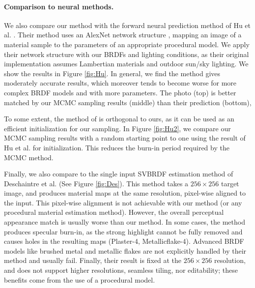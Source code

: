 



\paragraph*{Comparison to neural methods.}
We also compare our method with the forward neural prediction method of Hu et al. \cite{Hu2019}. Their method uses an AlexNet network structure \cite{krizhevsky2012imagenet}, mapping an image of a material sample to the parameters of an appropriate procedural model. We apply their network structure with our BRDFs and lighting conditions, as their original implementation assumes Lambertian materials and outdoor sun/sky lighting. We show the results in Figure \ref{fig:Hu}. In general, we find the method gives moderately accurate results, which moreover tends to become worse for more complex BRDF models and with more parameters. The photo (top) is better matched by our MCMC sampling results (middle) than their prediction (bottom),

To some extent, the method of \cite{Hu2019} is orthogonal to ours, as it can be used as an efficient initialization for our sampling. In Figure \ref{fig:Hu2}, we compare our MCMC sampling results with a random starting point to one using the result of Hu et al. for initialization. This reduces the burn-in period required by the MCMC method.

Finally, we also compare to the single input SVBRDF estimation method of Deschaintre et al. \cite{Deschaintre2018} (See Figure \ref{fig:Des}). This method takes a $256 \times 256$ target image, and produces material maps at the same resolution, pixel-wise aligned to the input. This pixel-wise alignment is not achievable with our method (or any procedural material estimation method). However, the overall perceptual appearance match is usually worse than our method. In some cases, the method produces specular burn-in, as the strong highlight cannot be fully removed and causes holes in the resulting maps (Plaster-4, Metallicflake-4). Advanced BRDF models like brushed metal and metallic flakes are not explicitly handled by their method and usually fail. Finally, their result is fixed at the $256 \times 256$ resolution, and does not support higher resolutions, seamless tiling, nor editability; these benefits come from the use of a procedural model.

